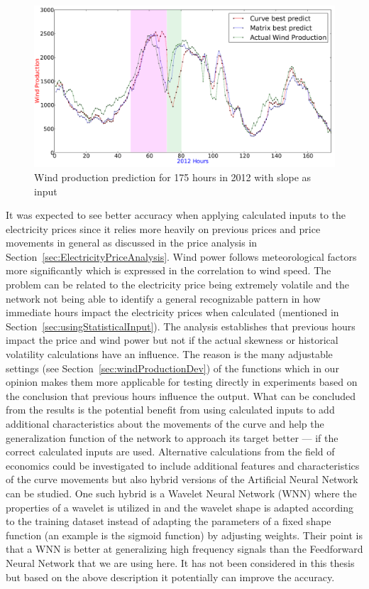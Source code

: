 \begin{figure}[H]
\centering
\includegraphics[width=0.99\linewidth]{billeder/curveAnalysisWindProduction.png}
\caption{Wind production prediction for 175 hours in 2012 with slope as input}
\label{fig:basicCurveAnalysisGraphoForDiscussion}
\end{figure}

It was expected to see better accuracy when applying calculated inputs to the electricity prices since it relies more heavily on previous prices and price movements in general as discussed in the price analysis in Section~\ref{sec:ElectricityPriceAnalysis}. Wind power follows meteorological factors more significantly which is expressed in the correlation to wind speed. The problem can be related to the electricity price being extremely volatile and the network not being able to identify a general recognizable pattern in how immediate hours impact the electricity prices when calculated (mentioned in Section~\ref{sec:usingStatisticalInput}). The analysis establishes that previous hours impact the price and wind power but not if the actual skewness or historical volatility calculations have an influence. The reason is the many adjustable settings (see Section~\ref{sec:windProductionDev}) of the functions which in our opinion makes them more applicable for testing directly in experiments based on the conclusion that previous hours influence the output. What can be concluded from the results is the potential benefit from using calculated inputs to add additional characteristics about the movements of the curve and help the generalization function of the network to approach its target better --- if the correct calculated inputs are used. Alternative calculations from the field of economics could be investigated to include additional features and characteristics of the curve movements but also hybrid versions of the Artificial Neural Network can be studied. One such hybrid is a Wavelet Neural Network (WNN) where the properties of a wavelet is utilized in \cite{adaptiveWaveletANNElectricityMarkets} and the wavelet shape is adapted according to the training dataset instead of adapting the parameters of a fixed shape function (an example is the sigmoid function) by adjusting weights. Their point is that a WNN is better at generalizing high frequency signals than the Feedforward Neural Network that we are using here. It has not been considered in this thesis but based on the above description it potentially can improve the accuracy.